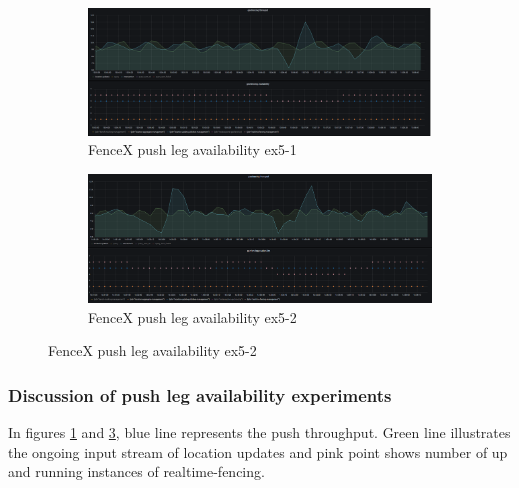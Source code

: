 \documentclass[a4]{report}
\begin{document}
    \begin{figure}
        \centering
        \begin{subfigure}[b]{\textwidth}
            \centering
            \caption{FenceX push leg availability ex5-1}
            \label{fig:ex5-1}
            \includegraphics[width=\textwidth, height=0.3\textheight, scale=2]{images/evaluation/ex5-benchmarking-ongoing-2per6sec.png}
        \end{subfigure}

        \begin{subfigure}[b]{\textwidth}
            \centering
            \caption{FenceX push leg availability ex5-2}
            \label{fig:ex5-2}
            \includegraphics[width=\textwidth, height=0.3\textheight, scale=2]{images/evaluation/ex5-benchmarking-ongoing-2per7sec.png}
        \end{subfigure}
    \end{figure}

    \clearpage

    \subsubsection{Discussion of push leg availability experiments}
    In figures \ref{fig:ex5-1} and \ref{fig:ex5-2}, blue line represents the push throughput.
    Green line illustrates the ongoing input stream of location updates and pink point shows
    number of up and running instances of realtime-fencing.
\end{document}
